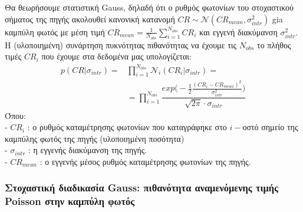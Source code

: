 Θα θεωρήσουμε στατιστική \textlatin{Gauss}, δηλαδή ότι ο ρυθμός φωτονίων του στοχαστικού σήματος της πηγής ακολουθεί κανονική κατανομή $CR \sim \mathcal{N} (CR_{mean}, \sigma_{intr}^2)$ gia καμπύλη φωτός με μέση τιμή $CR_{mean} = \frac{1}{N_{obs}} \sum_{i=1}^{N_{obs}} CR_i$ και εγγενή διακύμανση $\sigma_{intr}^2$. Η (υλοποιημένη) συνάρτηση πυκνότητας πιθανότητας να έχουμε τις $N_{obs}$ το πλήθος τιμές $CR_i$ που έχουμε στα δεδομένα μας υπολογίζεται:  
\begin{equation}\begin{aligned} {p} (CR|\sigma_{intr})= {} & \prod_{i=1}^{N_{obs}} \mathcal{N}_i(CR_i| \sigma_{intr}) =\\ & = \prod_{i=1}^{N_{obs}} \dfrac{exp \big(-\frac{1}{2} \frac{( CR_i-CR_{mean} )^2}{\sigma_{intr}^2}  \big)} {\sqrt{2\pi} \cdot \sigma_{intr}}  \label{eq:Gauss_tot}\end{aligned}\end{equation}
Όπου:\\
- $CR_i$ : ο ρυθμός καταμέτρησης φωτονίων που καταγράφηκε στο $i-$οστό σημείο της καμπύλης φωτός της πηγής (υλοποιημένη ποσότητα)\\
- $\sigma_{intr}$ : η εγγενής διακύμανση της πηγής.\\
- $ CR_{mean}$ : ο εγγενής μέσος ρυθμός καταμέτρησης φωτονίων της πηγής.

\subsubsection*{Στοχαστική διαδικασία \textlatin{Gauss}: πιθανότητα αναμενόμενης τιμής \textlatin{Poisson} στην καμπύλη φωτός}

